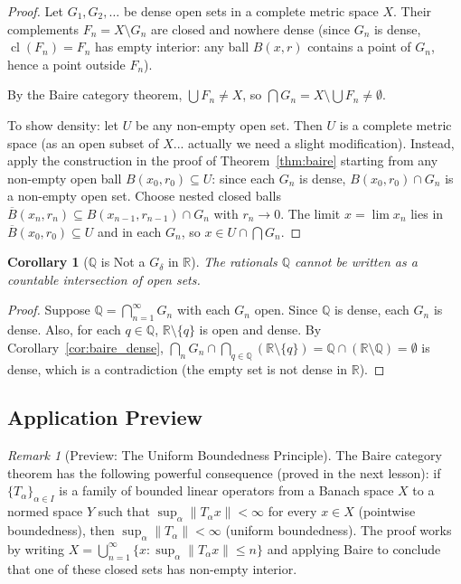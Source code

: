\documentclass[11pt,a4paper]{article}
\theoremstyle{definition}
\theoremstyle{plain}
\newtheorem{corollary}[theorem]{Corollary}
\theoremstyle{remark}
\newtheorem{remark}{Remark}[section]
\newcommand{\R}{\mathbb{R}}
\newcommand{\Q}{\mathbb{Q}}
\DeclareMathOperator{\cl}{cl}
\begin{document}
\begin{proof}
Let $G_1, G_2, \ldots$ be dense open sets in a complete metric space $X$. Their
complements $F_n = X \setminus G_n$ are closed and nowhere dense (since $G_n$ is
dense, $\cl(F_n) = F_n$ has empty interior: any ball $B(x,r)$ contains a point of
$G_n$, hence a point outside $F_n$).

By the Baire category theorem, $\bigcup F_n \ne X$, so
$\bigcap G_n = X \setminus \bigcup F_n \ne \emptyset$.

To show density: let $U$ be any non-empty open set. Then $U$ is a complete metric
space (as an open subset of $X$... actually we need a slight modification). Instead,
apply the construction in the proof of Theorem~\ref{thm:baire} starting from any
non-empty open ball $B(x_0, r_0) \subseteq U$: since each $G_n$ is dense,
$B(x_0, r_0) \cap G_n$ is a non-empty open set. Choose nested closed balls
$\overline{B}(x_n, r_n) \subseteq B(x_{n-1}, r_{n-1}) \cap G_n$ with $r_n \to 0$.
The limit $x = \lim x_n$ lies in $\overline{B}(x_0, r_0) \subseteq U$ and in each
$G_n$, so $x \in U \cap \bigcap G_n$.
\end{proof}

\begin{corollary}[$\Q$ is Not a $G_\delta$ in $\R$]
\label{cor:Q_not_Gdelta}
The rationals $\Q$ cannot be written as a countable intersection of open sets.
\end{corollary}

\begin{proof}
Suppose $\Q = \bigcap_{n=1}^\infty G_n$ with each $G_n$ open. Since $\Q$ is dense,
each $G_n$ is dense. Also, for each $q \in \Q$, $\R \setminus \{q\}$ is open and
dense. By Corollary~\ref{cor:baire_dense}, $\bigcap_{n} G_n \cap
\bigcap_{q \in \Q} (\R \setminus \{q\}) = \Q \cap (\R \setminus \Q) = \emptyset$
is dense, which is a contradiction (the empty set is not dense in $\R$).
\end{proof}

\subsection{Application Preview}

\begin{remark}[Preview: The Uniform Boundedness Principle]
\label{rem:ubp_preview}
The Baire category theorem has the following powerful consequence (proved in the
next lesson): if $\{T_\alpha\}_{\alpha \in I}$ is a family of bounded linear
operators from a Banach space $X$ to a normed space $Y$ such that
$\sup_\alpha \|T_\alpha x\| < \infty$ for every $x \in X$ (pointwise boundedness),
then $\sup_\alpha \|T_\alpha\| < \infty$ (uniform boundedness). The proof works by
writing $X = \bigcup_{n=1}^\infty \{x : \sup_\alpha \|T_\alpha x\| \le n\}$ and
applying Baire to conclude that one of these closed sets has non-empty interior.
\end{remark}
\end{document}
